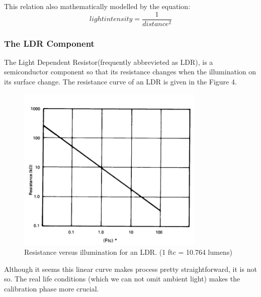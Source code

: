 \documentclass[letterpaper,12pt]{article}
\begin{document}
This relation also mathematically modelled by the equation:
\[light intensity  = \frac{1}{distance^2}\]
\subsubsection{The LDR Component}
The Light Dependent Resistor(frequently abbrevieted as LDR), is a semiconductor component so that its  resistance changes when the illumination on its surface change. The resistance curve of an LDR is given in the Figure 4.
\begin{figure}[H]
	\centering
   \includegraphics[width=0.8\textwidth]{resistance-illum.png}
   \caption{Resistance versus illumination for an LDR. (1 ftc = 10.764 lumens)}
\end{figure} 
Although it seems this linear curve makes process pretty straightforward, it is not so. The real life conditions (which we can not omit ambient light) makes the calibration phase more crucial.
\end{document}
